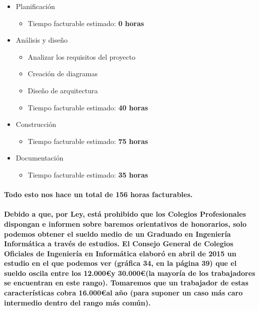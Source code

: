 \begin{itemize}
  \item Planificación
  \begin{itemize}
    \item{Tiempo facturable estimado: \textbf{0 horas}}
  \end{itemize}
\end{itemize}

\begin{itemize}
  \item Análisis y diseño
  \begin{itemize}
    \item{Analizar los requisitos del proyecto}
    \item{Creación de diagramas}
    \item{Diseño de arquitectura}
    \item{Tiempo facturable estimado: \textbf{40 horas}}
  \end{itemize}
\end{itemize}


\begin{itemize}
  \item Construcción
  \begin{itemize}
    \item{Tiempo facturable estimado: \textbf{75 horas}}
  \end{itemize}
\end{itemize}

\begin{itemize}
  \item Documentación
  \begin{itemize}
    \item{Tiempo facturable estimado: \textbf{35 horas}}
  \end{itemize}
\end{itemize}

\paragraph{
Todo esto nos hace un total de 156 horas facturables.
}

\paragraph{
Debido a que, por Ley, está prohibido que los Colegios Profesionales dispongan e informen
sobre baremos orientativos de honorarios, solo podemos obtener el sueldo medio de un Graduado
en Ingeniería Informática a través de estudios. El Consejo General de Colegios Oficiales de Ingeniería en Informática
elaboró en abril de 2015 un estudio \cite{estudioSalario} en el que podemos ver (gráfica 34, en la página 39) que el sueldo
oscila entre los 12.000\euro y 30.000\euro (la mayoría de los trabajadores se encuentran en este rango). Tomaremos que un trabajador
de estas características cobra 16.000\euro al año (para suponer un caso más caro intermedio dentro del rango más común).
}

